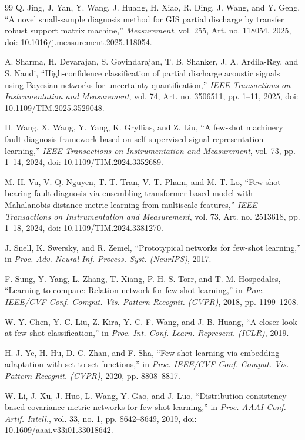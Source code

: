 \documentclass[journal]{IEEEtran}
\newcommand{\1}{\mathbf{1}}
\begin{document}
\begin{thebibliography}{99}
Q. Jing, J. Yan, Y. Wang, J. Huang, H. Xiao, R. Ding, J. Wang, and Y. Geng,
``A novel small-sample diagnosis method for GIS partial discharge by transfer robust support matrix machine,''
\emph{Measurement},
vol. 255, Art. no. 118054, 2025,
doi: 10.1016/j.measurement.2025.118054.

A. Sharma, H. Devarajan, S. Govindarajan, T. B. Shanker, J. A. Ardila-Rey, and S. Nandi,
``High-confidence classification of partial discharge acoustic signals using Bayesian networks for uncertainty quantification,''
\emph{IEEE Transactions on Instrumentation and Measurement},
vol. 74, Art. no. 3506511, pp. 1--11, 2025,
doi: 10.1109/TIM.2025.3529048.

H. Wang, X. Wang, Y. Yang, K. Gryllias, and Z. Liu,
``A few-shot machinery fault diagnosis framework based on self-supervised signal representation learning,''
\emph{IEEE Transactions on Instrumentation and Measurement},
vol. 73, pp. 1--14, 2024,
doi: 10.1109/TIM.2024.3352689.

M.-H. Vu, V.-Q. Nguyen, T.-T. Tran, V.-T. Pham, and M.-T. Lo,
``Few-shot bearing fault diagnosis via ensembling transformer-based model with Mahalanobis distance metric learning from multiscale features,''
\emph{IEEE Transactions on Instrumentation and Measurement},
vol. 73, Art. no. 2513618, pp. 1--18, 2024,
doi: 10.1109/TIM.2024.3381270.

J. Snell, K. Swersky, and R. Zemel,
``Prototypical networks for few-shot learning,''
in \emph{Proc. Adv. Neural Inf. Process. Syst. (NeurIPS)}, 2017.

F. Sung, Y. Yang, L. Zhang, T. Xiang, P. H. S. Torr, and T. M. Hospedales,
``Learning to compare: Relation network for few-shot learning,''
in \emph{Proc. IEEE/CVF Conf. Comput. Vis. Pattern Recognit. (CVPR)}, 2018, pp. 1199--1208.

W.-Y. Chen, Y.-C. Liu, Z. Kira, Y.-C. F. Wang, and J.-B. Huang,
``A closer look at few-shot classification,''
in \emph{Proc. Int. Conf. Learn. Represent. (ICLR)}, 2019.

H.-J. Ye, H. Hu, D.-C. Zhan, and F. Sha,
``Few-shot learning via embedding adaptation with set-to-set functions,''
in \emph{Proc. IEEE/CVF Conf. Comput. Vis. Pattern Recognit. (CVPR)}, 2020, pp. 8808--8817.

W. Li, J. Xu, J. Huo, L. Wang, Y. Gao, and J. Luo,
``Distribution consistency based covariance metric networks for few-shot learning,''
in \emph{Proc. AAAI Conf. Artif. Intell.}, vol. 33, no. 1, pp. 8642--8649, 2019,
doi: 10.1609/aaai.v33i01.33018642.


\end{thebibliography}
\end{document}
